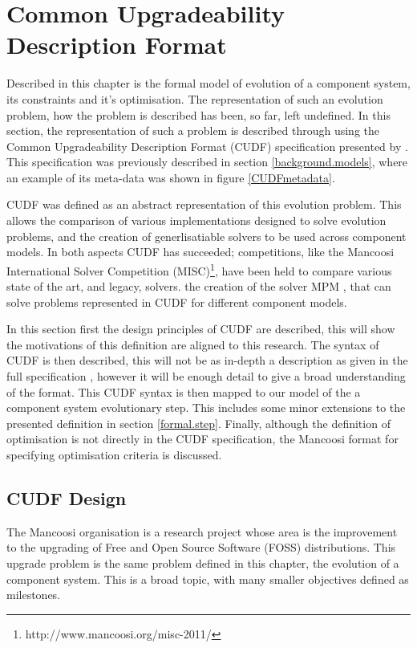 \section{Common Upgradeability Description Format}
\label{formal.cudf}
Described in this chapter is the formal model of evolution of a component system, its constraints and it's optimisation.
The representation of such an evolution problem, how the problem is described has been, so far, left undefined.
In this section, the representation of such a problem is described through using the Common Upgradeability Description Format (CUDF) specification presented by \cite{treinen2009common}.
This specification was previously described in section \ref{background.models}, where an example of its meta-data was shown in figure \ref{CUDFmetadata}.

CUDF was defined as an abstract representation of this evolution problem.
This allows the comparison of various implementations designed to solve evolution problems, and the creation of generlisatiable solvers to be used across component models.
In both aspects CUDF has succeeded;
competitions, like the Mancoosi International Solver Competition (MISC)\footnote{http://www.mancoosi.org/misc-2011/}, have been held to compare various state of the art, and legacy, solvers.
the creation of the solver MPM \cite{abate2011}, that can solve problems represented in CUDF for different component models.

In this section first the design principles of CUDF are described, this will show the motivations of this definition are aligned to this research.
The syntax of CUDF is then described, this will not be as in-depth a description as given in the full specification \cite{treinen2009common},
however it will be enough detail to give a broad understanding of the format.
This CUDF syntax is then mapped to our model of the a component system evolutionary step.
This includes some minor extensions to the presented definition in section \ref{formal.step}.
Finally, although the definition of optimisation is not directly in the CUDF specification, the Mancoosi format for specifying optimisation criteria is discussed.

\subsection{CUDF Design}
The Mancoosi organisation is a research project whose area is the improvement to the upgrading of Free and Open Source Software (FOSS) distributions.
This upgrade problem is the same problem defined in this chapter, the evolution of a component system.
This is a broad topic, with many smaller objectives defined as milestones.

